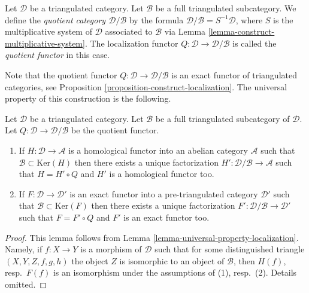\begin{definition}
\label{definition-quotient-category}
Let $\mathcal{D}$ be a triangulated category.
Let $\mathcal{B}$ be a full triangulated subcategory.
We define the {\it quotient category $\mathcal{D}/\mathcal{B}$}
by the formula $\mathcal{D}/\mathcal{B} = S^{-1}\mathcal{D}$, where
$S$ is the multiplicative system of $\mathcal{D}$ associated to
$\mathcal{B}$ via
Lemma \ref{lemma-construct-multiplicative-system}.
The localization functor $Q : \mathcal{D} \to \mathcal{D}/\mathcal{B}$
is called the {\it quotient functor} in this case.
\end{definition}

\noindent
Note that the quotient functor
$Q : \mathcal{D} \to \mathcal{D}/\mathcal{B}$
is an exact functor of triangulated categories, see
Proposition \ref{proposition-construct-localization}.
The universal property of this construction is the following.

\begin{lemma}
\label{lemma-universal-property-quotient}
Let $\mathcal{D}$ be a triangulated category. Let $\mathcal{B}$
be a full triangulated subcategory of $\mathcal{D}$. Let
$Q : \mathcal{D} \to \mathcal{D}/\mathcal{B}$ be the quotient functor.
\begin{enumerate}
\item If $H : \mathcal{D} \to \mathcal{A}$ is a homological functor into
an abelian category $\mathcal{A}$ such that
$\mathcal{B} \subset \text{Ker}(H)$ then there exists a unique factorization
$H' : \mathcal{D}/\mathcal{B} \to \mathcal{A}$ such that $H = H' \circ Q$
and $H'$ is a homological functor too.
\item If $F : \mathcal{D} \to \mathcal{D}'$ is an exact functor into
a pre-triangulated category $\mathcal{D}'$ such that
$\mathcal{B} \subset \text{Ker}(F)$ then there exists a unique factorization
$F' : \mathcal{D}/\mathcal{B} \to \mathcal{D}'$ such that $F = F' \circ Q$
and $F'$ is an exact functor too.
\end{enumerate}
\end{lemma}

\begin{proof}
This lemma follows from
Lemma \ref{lemma-universal-property-localization}.
Namely, if $f : X \to Y$ is a morphism of $\mathcal{D}$
such that for some distinguished triangle $(X, Y, Z, f, g, h)$
the object $Z$ is isomorphic to an object of $\mathcal{B}$, then
$H(f)$, resp.\ $F(f)$ is an isomorphism under the assumptions of
(1), resp.\ (2). Details omitted.
\end{proof}

